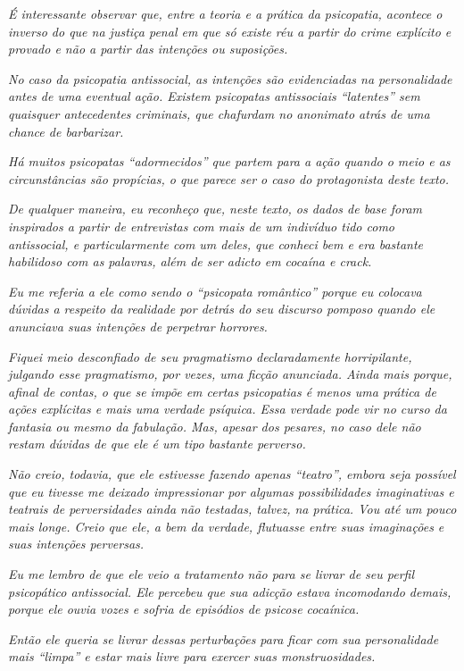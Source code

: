 \emph{É interessante observar que, entre a teoria e a prática da
psicopatia, acontece o inverso do que na justiça penal em que só existe
réu a partir do crime explícito e provado e não a partir das intenções
ou suposições.}~

\emph{No caso da psicopatia antissocial, as intenções são evidenciadas na
personalidade antes de uma eventual ação. Existem psicopatas
antissociais ``latentes'' sem quaisquer antecedentes criminais, que
chafurdam no anonimato atrás de uma chance de barbarizar.}~

\emph{Há muitos psicopatas ``adormecidos'' que partem para a ação quando
o meio e as circunstâncias são propícias, o que parece ser o caso do
protagonista deste texto.}~

\emph{De qualquer maneira, eu reconheço que, neste texto, os dados de
base foram inspirados a partir de entrevistas com mais de um indivíduo
tido como antissocial, e particularmente com um deles, que conheci bem e
era bastante habilidoso com as palavras, além de ser adicto em cocaína e
crack.}~

\emph{Eu me referia a ele como sendo o ``psicopata romântico'' porque eu
colocava dúvidas a respeito da realidade por detrás do seu discurso
pomposo quando ele anunciava suas intenções de perpetrar horrores.}~

\emph{Fiquei meio desconfiado de seu pragmatismo declaradamente
horripilante, julgando esse pragmatismo, por vezes, uma ficção
anunciada. Ainda mais porque, afinal de contas, o que se impõe em certas
psicopatias é menos uma prática de ações explícitas e mais uma verdade
psíquica. Essa verdade pode vir no curso da fantasia ou mesmo da
fabulação. Mas, apesar dos pesares, no caso dele não restam dúvidas de
que ele é um tipo bastante perverso.}

\emph{Não creio, todavia, que ele estivesse fazendo apenas ``teatro'',
embora seja possível que eu tivesse me deixado impressionar por algumas
possibilidades imaginativas e teatrais de perversidades ainda não
testadas, talvez, na prática. Vou até um pouco mais longe. Creio que
ele, a bem da verdade, flutuasse entre suas imaginações e suas intenções
perversas.}~

\emph{Eu me lembro de que ele veio a tratamento não para se livrar de
seu perfil psicopático antissocial. Ele percebeu que sua adicção estava
incomodando demais, porque ele ouvia vozes e sofria de episódios de
psicose cocaínica.}~

\emph{Então ele queria se livrar dessas perturbações para ficar com sua
personalidade mais ``limpa'' e estar mais livre para exercer suas
monstruosidades.}~

